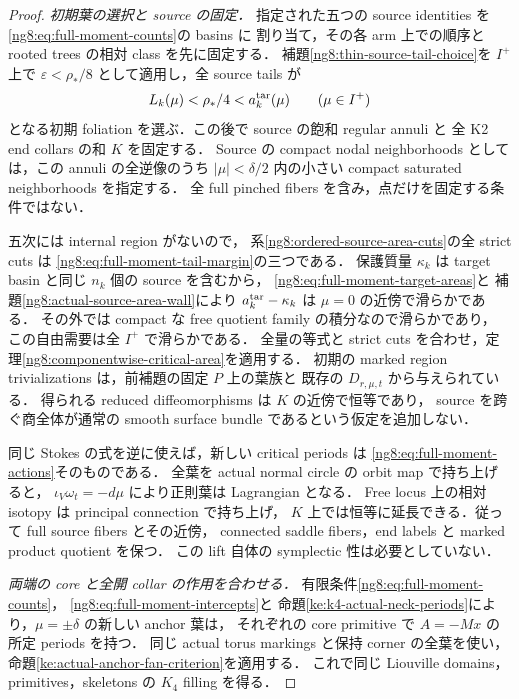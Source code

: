 \begin{proof}
\emph{初期葉の選択と source の固定．}
指定された五つの source identities を\eqref{ng8:eq:full-moment-counts}の basins に
割り当て，その各 arm 上での順序と rooted trees の相対 class を先に固定する．
補題\ref{ng8:thin-source-tail-choice}を $I^+$ 上で
$\varepsilon<\rho_*/8$ として適用し，全 source tails が
\begin{equation}\label{ng8:eq:full-moment-tail-margin}
 L_k(\mu)<\rho_*/4<a_k^{\rm tar}(\mu)
 \qquad(\mu\in I^+)
\end{equation}
となる初期 foliation を選ぶ．この後で source の飽和 regular annuli と
全 K2 end collars の和 $K$ を固定する．
Source の compact nodal neighborhoods としては，この annuli の全逆像のうち
$|\mu|<\delta/2$ 内の小さい compact saturated neighborhoods を指定する．
全 full pinched fibers を含み，点だけを固定する条件ではない．

五次には internal region がないので，
系\ref{ng8:ordered-source-area-cuts}の全 strict cuts は
\eqref{ng8:eq:full-moment-tail-margin}の三つである．
保護質量 $\kappa_k$ は target basin と同じ $n_k$ 個の source を含むから，
\eqref{ng8:eq:full-moment-target-areas}と
補題\ref{ng8:actual-source-area-wall}により
$a_k^{\rm tar}-\kappa_k$ は $\mu=0$ の近傍で滑らかである．
その外では compact な free quotient family の積分なので滑らかであり，
この自由需要は全 $I^+$ で滑らかである．
全量の等式と strict cuts を合わせ，定理\ref{ng8:componentwise-critical-area}を適用する．
初期の marked region trivializations は，前補題の固定 $P$ 上の葉族と
既存の $D_{r,\mu,t}$ から与えられている．
得られる reduced diffeomorphisms は $K$ の近傍で恒等であり，
source を跨ぐ商全体が通常の smooth surface bundle であるという仮定を追加しない．

同じ Stokes の式を逆に使えば，新しい critical periods は
\eqref{ng8:eq:full-moment-actions}そのものである．
全葉を actual normal circle の orbit map で持ち上げると，
$\iota_V\omega_t=-d\mu$ により正則葉は Lagrangian となる．
Free locus 上の相対 isotopy は principal connection で持ち上げ，
$K$ 上では恒等に延長できる．従って full source fibers とその近傍，
connected saddle fibers，end labels と marked product quotient を保つ．
この lift 自体の symplectic 性は必要としていない．

\emph{両端の core と全開 collar の作用を合わせる．}
有限条件\eqref{ng8:eq:full-moment-counts}，
\eqref{ng8:eq:full-moment-intercepts}と
命題\ref{ke:k4-actual-neck-periods}により，$\mu=\pm\delta$ の新しい anchor 葉は，
それぞれの core primitive で $A=-Mx$ の所定 periods を持つ．
同じ actual torus markings と保持 corner の全葉を使い，
命題\ref{ke:actual-anchor-fan-criterion}を適用する．
これで同じ Liouville domains，primitives，skeletons の $K_4$ filling を得る．


\end{proof}
